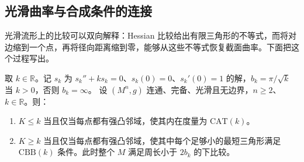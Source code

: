 \subsection{光滑曲率与合成条件的连接}
\label{g3:subsec:1005:03}
光滑流形上的比较可以双向解释：Hessian 比较给出有限三角形的不等式，而将对边缩到一个点，再将径向距离缩到零，能够从这些不等式恢复截面曲率。下面把这个过程写出。

\begin{theorem}\label{g3:thm:smooth-synthetic-curvature}
	取 \(k\in\mathbb R\)。记 \(s_k\) 为 \(s_k''+ks_k=0\)、\(s_k(0)=0\)、\(s_k'(0)=1\) 的解，\(b_k=\pi/\sqrt k\) 当 \(k>0\)，否则 \(b_k=\infty\)。
	设 \((M^n,g)\) 连通、完备、光滑且无边界，\(n\ge2\)、\(k\in\mathbb R\)。则：
	\begin{enumerate}
		\item \(K\le k\) 当且仅当每点都有强凸邻域，使其内在度量为 \(\mathrm{CAT}(k)\)。
		\item \(K\ge k\) 当且仅当每点都有强凸邻域，使其中每个足够小的最短三角形满足 \(\mathrm{CBB}(k)\) 条件。此时整个 \(M\) 满足周长小于 \(2b_k\) 的下比较。
	\end{enumerate}
\end{theorem}
